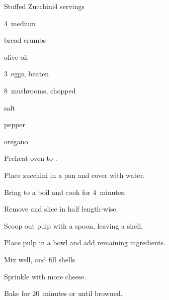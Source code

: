\begin{recipe}{Stuffed Zucchini}{}{4 servings}

\begin{ingredients}
\item 4~medium 
\item \C{\half} bread crumbs
\item {} olive oil
\item 3~eggs, beaten
\item \C{\half} 
\item 8~mushrooms, chopped
\item salt
\item pepper
\item oregano
\end{ingredients}

\begin{directions}
\item Preheat oven to .
\item Place zucchini in a pan and cover with water.
\item Bring to a boil and cook for 4~minutes.
\item Remove and slice in half length-wise.
\item Scoop out pulp with a spoon, leaving a shell.
\item Place pulp in a bowl and add remaining ingredients.
\item Mix well, and fill shells.
\item Sprinkle with more cheese.
\item Bake for 20~minutes or until browned.
\end{directions}

\hint{}
\end{recipe}
